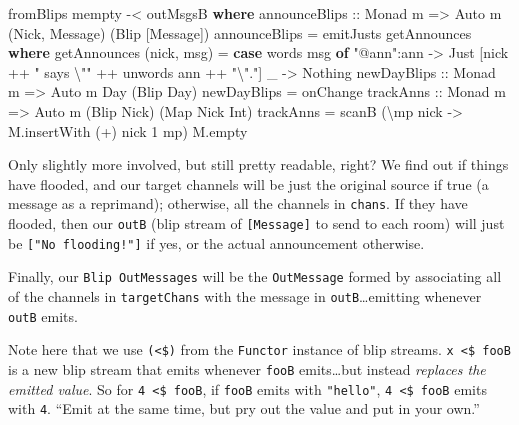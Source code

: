\documentclass[]{article}
\newenvironment{Shaded}{}{}
\newcommand{\KeywordTok}[1]{\textcolor[rgb]{0.00,0.44,0.13}{\textbf{{#1}}}}
\newcommand{\DataTypeTok}[1]{\textcolor[rgb]{0.56,0.13,0.00}{{#1}}}
\newcommand{\DecValTok}[1]{\textcolor[rgb]{0.25,0.63,0.44}{{#1}}}
\newcommand{\StringTok}[1]{\textcolor[rgb]{0.25,0.44,0.63}{{#1}}}
\newcommand{\OtherTok}[1]{\textcolor[rgb]{0.00,0.44,0.13}{{#1}}}
\newcommand{\FunctionTok}[1]{\textcolor[rgb]{0.02,0.16,0.49}{{#1}}}
\newcommand{\NormalTok}[1]{{#1}}
\begin{document}
\begin{Shaded}
\begin{Highlighting}[]
    \NormalTok{fromBlips mempty }\FunctionTok{-<} \NormalTok{outMsgsB}
  \KeywordTok{where}
\OtherTok{    announceBlips ::} \DataTypeTok{Monad} \NormalTok{m }\OtherTok{=>} \DataTypeTok{Auto} \NormalTok{m (}\DataTypeTok{Nick}\NormalTok{, }\DataTypeTok{Message}\NormalTok{) (}\DataTypeTok{Blip} \NormalTok{[}\DataTypeTok{Message}\NormalTok{])}
    \NormalTok{announceBlips }\FunctionTok{=} \NormalTok{emitJusts getAnnounces}
      \KeywordTok{where}
        \NormalTok{getAnnounces (nick, msg) }\FunctionTok{=}
          \KeywordTok{case} \NormalTok{words msg }\KeywordTok{of}
            \StringTok{"@ann"}\FunctionTok{:}\NormalTok{ann }\OtherTok{->} \DataTypeTok{Just} \NormalTok{[nick }\FunctionTok{++} \StringTok{" says \textbackslash{}""} \FunctionTok{++} \NormalTok{unwords ann }\FunctionTok{++} \StringTok{"\textbackslash{}"."}\NormalTok{]}
            \NormalTok{_          }\OtherTok{->} \DataTypeTok{Nothing}
\OtherTok{    newDayBlips ::} \DataTypeTok{Monad} \NormalTok{m }\OtherTok{=>} \DataTypeTok{Auto} \NormalTok{m }\DataTypeTok{Day} \NormalTok{(}\DataTypeTok{Blip} \DataTypeTok{Day}\NormalTok{)}
    \NormalTok{newDayBlips }\FunctionTok{=} \NormalTok{onChange}
\OtherTok{    trackAnns ::} \DataTypeTok{Monad} \NormalTok{m }\OtherTok{=>} \DataTypeTok{Auto} \NormalTok{m (}\DataTypeTok{Blip} \DataTypeTok{Nick}\NormalTok{) (}\DataTypeTok{Map} \DataTypeTok{Nick} \DataTypeTok{Int}\NormalTok{)}
    \NormalTok{trackAnns }\FunctionTok{=} \NormalTok{scanB (\textbackslash{}mp nick }\OtherTok{->} \NormalTok{M.insertWith (}\FunctionTok{+}\NormalTok{) nick }\DecValTok{1} \NormalTok{mp) M.empty}
\end{Highlighting}
\end{Shaded}

Only slightly more involved, but still pretty readable, right? We find out if
things have flooded, and our target channels will be just the original source if
true (a message as a reprimand); otherwise, all the channels in \texttt{chans}.
If they have flooded, then our \texttt{outB} (blip stream of
\texttt{{[}Message{]}} to send to each room) will just be
\texttt{{[}"No\ flooding!"{]}} if yes, or the actual announcement otherwise.

Finally, our \texttt{Blip\ OutMessages} will be the \texttt{OutMessage} formed
by associating all of the channels in \texttt{targetChans} with the message in
\texttt{outB}\ldots{}emitting whenever \texttt{outB} emits.

Note here that we use \texttt{(\textless{}\$)} from the \texttt{Functor}
instance of blip streams. \texttt{x\ \textless{}\$\ fooB} is a new blip stream
that emits whenever \texttt{fooB} emits\ldots{}but instead \emph{replaces the
emitted value}. So for \texttt{4\ \textless{}\$\ fooB}, if \texttt{fooB} emits
with \texttt{"hello"}, \texttt{4\ \textless{}\$\ fooB} emits with \texttt{4}.
``Emit at the same time, but pry out the value and put in your own.''
\end{document}
